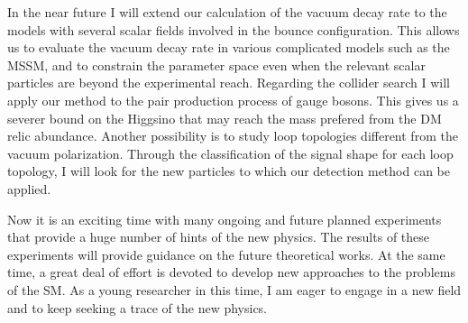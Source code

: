\documentclass[12pt,notitlepage]{book}
\begin{document}
In the near future I will extend our calculation of the vacuum decay rate to the models with several scalar fields involved in the bounce configuration.
This allows us to evaluate the vacuum decay rate in various complicated models such as the MSSM, and to constrain the parameter space even when the relevant scalar particles are beyond the experimental reach.
Regarding the collider search I will apply our method to the pair production process of gauge bosons.
This gives us a severer bound on the Higgsino that may reach the mass prefered from the DM relic abundance.
Another possibility is to study loop topologies different from the vacuum polarization.
Through the classification of the signal shape for each loop topology, I will look for the new particles to which our detection method can be applied.

Now it is an exciting time with many ongoing and future planned experiments that provide a huge number of hints of the new physics.
The results of these experiments will provide guidance on the future theoretical works.
At the same time, a great deal of effort is devoted to develop new approaches to the problems of the SM.
As a young researcher in this time, I am eager to engage in a new field and to keep seeking a trace of the new physics.
\end{document}
